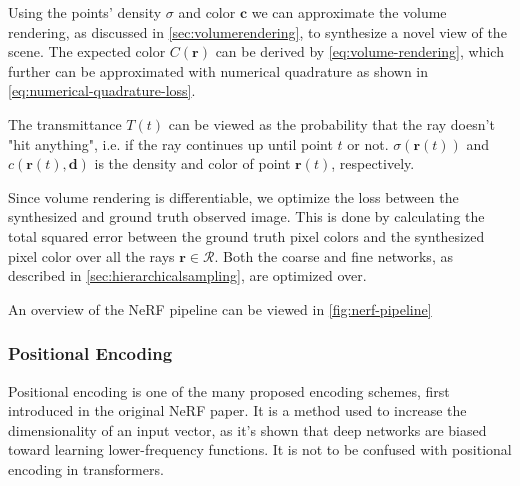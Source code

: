 Using the points' density $\sigma$ and color $\pmb{c}$ we can approximate the volume rendering, as discussed in \autoref{sec:volumerendering}, to synthesize a novel view of the scene. The expected color $C(\pmb{r})$ can be derived by \autoref{eq:volume-rendering}, which further can be approximated with numerical quadrature as shown in \autoref{eq:numerical-quadrature-loss}.





The transmittance $T(t)$ can be viewed as the probability that the ray doesn't "hit anything", i.e. if the ray continues up until point $t$ or not. $\sigma(\pmb{r}(t))$ and $c(\pmb{r}(t), \pmb{d})$ is the density and color of point $\pmb{r}(t)$, respectively.

Since volume rendering is differentiable, we optimize the loss between the synthesized and ground truth observed image. This is done by calculating the total squared error between the ground truth pixel colors and the synthesized pixel color over all the rays $\pmb{r} \in \mathcal{R}$. Both the coarse and fine networks, as described in \autoref{sec:hierarchicalsampling}, are optimized over.



An overview of the NeRF pipeline can be viewed in \autoref{fig:nerf-pipeline}



\subsubsection{Positional Encoding} \label{sec:positionalencoding}
Positional encoding is one of the many proposed encoding schemes, first introduced in the original NeRF paper. It is a method used to increase the dimensionality of an input vector, as it's shown that deep networks are biased toward learning lower-frequency functions. It is not to be confused with positional encoding in transformers. 

